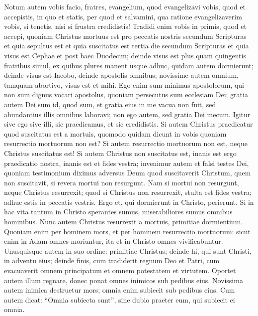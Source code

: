 \begin{biblechapter}
\begin{biblechapter}
\begin{biblechapter}
\begin{biblechapter}
\begin{biblechapter}
\begin{biblechapter}
\begin{biblechapter}
\begin{biblechapter}
\begin{biblechapter}
\begin{biblechapter}
\begin{biblechapter}
\begin{biblechapter}
\begin{biblechapter}
\begin{biblechapter}
\begin{biblechapter}
\verse Notum autem vobis facio, fratres, evangelium, quod evangelizavi vobis, quod et accepistis, in quo et statis, 
\verse per quod et salvamini, qua ratione evangelizaverim vobis, si tenetis, nisi si frustra credidistis! 
\verse Tradidi enim vobis in primis, quod et accepi, quoniam Christus mortuus est pro peccatis nostris secundum Scripturas 
\verse et quia sepultus est et quia suscitatus est tertia die secundum Scripturas 
\verse et quia visus est Cephae et post haec Duodecim; 
\verse deinde visus est plus quam quingentis fratribus simul, ex quibus plures manent usque adhuc, quidam autem dormierunt; 
\verse deinde visus est Iacobo, deinde apostolis omnibus; 
\verse novissime autem omnium, tamquam abortivo, visus est et mihi. 
\verse Ego enim sum minimus apostolorum, qui non sum dignus vocari apostolus, quoniam persecutus sum ecclesiam Dei; 
\verse gratia autem Dei sum id, quod sum, et gratia eius in me vacua non fuit, sed abundantius illis omnibus laboravi; non ego autem, sed gratia Dei mecum. 
\verse Igitur sive ego sive illi, sic praedicamus, et sic credidistis.
 \verse Si autem Christus praedicatur quod suscitatus est a mortuis, quomodo quidam dicunt in vobis quoniam resurrectio mortuorum non est? 
\verse Si autem resurrectio mortuorum non est, neque Christus suscitatus est! 
\verse Si autem Christus non suscitatus est, inanis est ergo praedicatio nostra, inanis est et fides vestra; 
\verse invenimur autem et falsi testes Dei, quoniam testimonium diximus adversus Deum quod suscitaverit Christum, quem non suscitavit, si revera mortui non resurgunt. 
\verse Nam si mortui non resurgunt, neque Christus resurrexit; 
\verse quod si Christus non resurrexit, stulta est fides vestra; adhuc estis in peccatis vestris. 
\verse Ergo et, qui dormierunt in Christo, perierunt. 
\verse Si in hac vita tantum in Christo sperantes sumus, miserabiliores sumus omnibus hominibus.
 \verse Nunc autem Christus resurrexit a mortuis, primitiae dormientium. 
\verse Quoniam enim per hominem mors, et per hominem resurrectio mortuorum: 
\verse sicut enim in Adam omnes moriuntur, ita et in Christo omnes vivificabuntur. 
 \verse Unusquisque autem in suo ordine: primitiae Christus; deinde hi, qui sunt Christi, in adventu eius; 
\verse deinde finis, cum tradiderit regnum Deo et Patri, cum evacuaverit omnem principatum et omnem potestatem et virtutem. 
\verse Oportet autem illum regnare, donec ponat omnes inimicos sub pedibus eius. 
\verse Novissima autem inimica destruetur mors; 
\verse omnia enim subiecit sub pedibus eius. Cum autem dicat: “Omnia subiecta sunt”, sine dubio praeter eum, qui subiecit ei omnia. 

\end{biblechapter}
\end{biblechapter}
\end{biblechapter}
\end{biblechapter}
\end{biblechapter}
\end{biblechapter}
\end{biblechapter}
\end{biblechapter}
\end{biblechapter}
\end{biblechapter}
\end{biblechapter}
\end{biblechapter}
\end{biblechapter}
\end{biblechapter}
\end{biblechapter}
